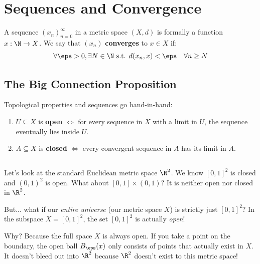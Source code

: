 
\section{Sequences and Convergence}

A sequence $(x_n)_{n=0}^\infty$ in a metric space $(X, d)$ is formally a function $x: \N \to X$. We say that $(x_n)$ \textbf{converges} to $x \in X$ if:
\[ \forall \eps > 0, \exists N \in \N \text{ s.t. } d(x_n, x) < \eps \quad \forall n \ge N \]

\subsection*{The Big Connection Proposition}
Topological properties and sequences go hand-in-hand:
\begin{enumerate}
    \item $U \subseteq X$ is \textbf{open} $\iff$ for every sequence in $X$ with a limit in $U$, the sequence eventually lies inside $U$.
    \item $A \subseteq X$ is \textbf{closed} $\iff$ every convergent sequence in $A$ has its limit in $A$.
\end{enumerate}

\subsection*{}
Let's look at the standard Euclidean metric space $\R^2$. 
We know $[0,1]^2$ is closed and $(0,1)^2$ is open. What about $[0,1] \times (0,1)$? It is neither open nor closed in $\R^2$.

\textcolor{eDarkRed}{But...} what if our \textit{entire universe} (our metric space $X$) is strictly just $[0,1]^2$? 
In the subspace $X = [0,1]^2$, the set $[0,1]^2$ is actually \emph{open}! 

\textcolor{eDarkCyan}{Why?} Because the full space $X$ is always open. If you take a point on the boundary, the open ball $B_\eps(x)$ only consists of points \textcolor{eSaddleBrown}{that actually exist in $X$}. It doesn't bleed out into $\R^2$ because $\R^2$ doesn't exist to this metric space!


